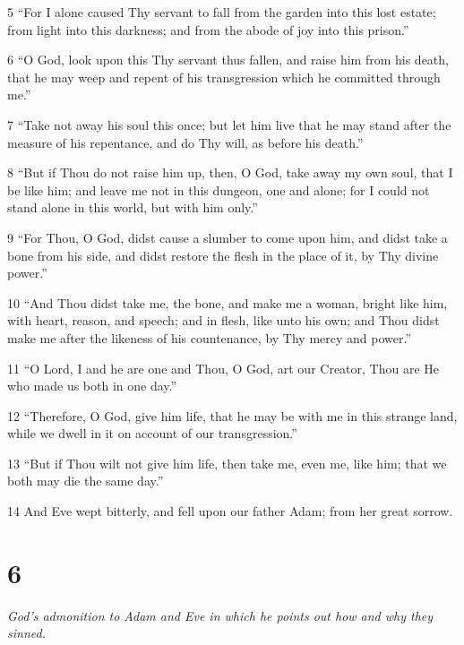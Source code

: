 \par 5 “For I alone caused Thy servant to fall from the garden into this lost estate; from light into this darkness; and from the abode of joy into this prison.”

\par 6 “O God, look upon this Thy servant thus fallen, and raise him from his death, that he may weep and repent of his transgression which he committed through me.”

\par 7 “Take not away his soul this once; but let him live that he may stand after the measure of his repentance, and do Thy will, as before his death.”

\par 8 “But if Thou do not raise him up, then, O God, take away my own soul, that I be like him; and leave me not in this dungeon, one and alone; for I could not stand alone in this world, but with him only.”

\par 9 “For Thou, O God, didst cause a slumber to come upon him, and didst take a bone from his side, and didst restore the flesh in the place of it, by Thy divine power.”

\par 10 “And Thou didst take me, the bone, and make me a woman, bright like him, with heart, reason, and speech; and in flesh, like unto his own; and Thou didst make me after the likeness of his countenance, by Thy mercy and power.”

\par 11 “O Lord, I and he are one and Thou, O God, art our Creator, Thou are He who made us both in one day.”

\par 12 “Therefore, O God, give him life, that he may be with me in this strange land, while we dwell in it on account of our transgression.”

\par 13 “But if Thou wilt not give him life, then take me, even me, like him; that we both may die the same day.”

\par 14 And Eve wept bitterly, and fell upon our father Adam; from her great sorrow.

\chapter{6}

\par \textit{God's admonition to Adam and Eve in which he points out how and why they sinned.}

